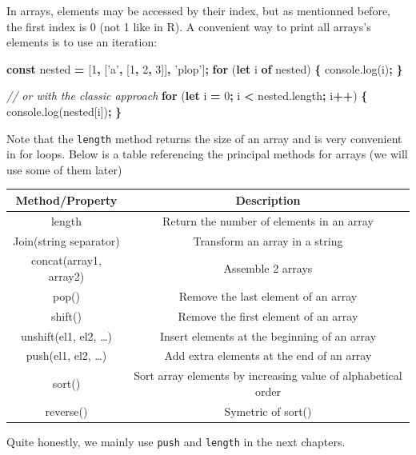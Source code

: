 \documentclass[
]{book}
\newenvironment{Shaded}{\begin{snugshade}}{\end{snugshade}}
\newcommand{\AttributeTok}[1]{\textcolor[rgb]{0.77,0.63,0.00}{#1}}
\newcommand{\CommentTok}[1]{\textcolor[rgb]{0.56,0.35,0.01}{\textit{#1}}}
\newcommand{\ControlFlowTok}[1]{\textcolor[rgb]{0.13,0.29,0.53}{\textbf{#1}}}
\newcommand{\DecValTok}[1]{\textcolor[rgb]{0.00,0.00,0.81}{#1}}
\newcommand{\KeywordTok}[1]{\textcolor[rgb]{0.13,0.29,0.53}{\textbf{#1}}}
\newcommand{\NormalTok}[1]{#1}
\newcommand{\OperatorTok}[1]{\textcolor[rgb]{0.81,0.36,0.00}{\textbf{#1}}}
\newcommand{\StringTok}[1]{\textcolor[rgb]{0.31,0.60,0.02}{#1}}
\newcommand{\VariableTok}[1]{\textcolor[rgb]{0.00,0.00,0.00}{#1}}
\begin{document}
In arrays, elements may be accessed by their index, but as mentionned before, the first index is 0 (not 1 like in R). A convenient way to print all arrays's elements is to use an iteration:

\begin{Shaded}
\begin{Highlighting}[]
\KeywordTok{const}\NormalTok{ nested }\OperatorTok{=}\NormalTok{ [}\DecValTok{1}\OperatorTok{,}\NormalTok{ [}\StringTok{'a'}\OperatorTok{,}\NormalTok{ [}\DecValTok{1}\OperatorTok{,} \DecValTok{2}\OperatorTok{,} \DecValTok{3}\NormalTok{]]}\OperatorTok{,} \StringTok{'plop'}\NormalTok{]}\OperatorTok{;}
\ControlFlowTok{for}\NormalTok{ (}\KeywordTok{let}\NormalTok{ i }\KeywordTok{of}\NormalTok{ nested) }\OperatorTok{\{}
  \VariableTok{console}\NormalTok{.}\AttributeTok{log}\NormalTok{(i)}\OperatorTok{;}
\OperatorTok{\}}

\CommentTok{// or with the classic approach}
\ControlFlowTok{for}\NormalTok{ (}\KeywordTok{let}\NormalTok{ i }\OperatorTok{=} \DecValTok{0}\OperatorTok{;}\NormalTok{ i }\OperatorTok{<} \VariableTok{nested}\NormalTok{.}\AttributeTok{length}\OperatorTok{;}\NormalTok{ i}\OperatorTok{++}\NormalTok{) }\OperatorTok{\{}
  \VariableTok{console}\NormalTok{.}\AttributeTok{log}\NormalTok{(nested[i])}\OperatorTok{;}
\OperatorTok{\}}
\end{Highlighting}
\end{Shaded}

Note that the \texttt{length} method returns the size of an array and is very convenient in for loops. Below is a table referencing the principal methods for arrays (we will use some of them later)

\begin{longtable}[]{@{}cc@{}}
\toprule
Method/Property & Description\tabularnewline
\midrule
\endhead
length & Return the number of elements in an array\tabularnewline
Join(string separator) & Transform an array in a string\tabularnewline
concat(array1, array2) & Assemble 2 arrays\tabularnewline
pop() & Remove the last element of an array\tabularnewline
shift() & Remove the first element of an array\tabularnewline
unshift(el1, el2, \ldots) & Insert elements at the beginning of an array\tabularnewline
push(el1, el2, \ldots) & Add extra elements at the end of an array\tabularnewline
sort() & Sort array elements by increasing value of alphabetical order\tabularnewline
reverse() & Symetric of sort()\tabularnewline
\bottomrule
\end{longtable}

Quite honestly, we mainly use \texttt{push} and \texttt{length} in the next chapters.
\end{document}
